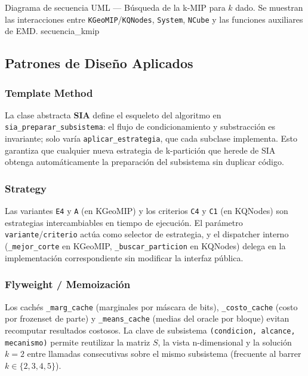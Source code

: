 %
  {Diagrama de secuencia UML — Búsqueda de la k-MIP para $k$ dado.
   Se muestran las interacciones entre \texttt{KGeoMIP}/\texttt{KQNodes},
   \texttt{System}, \texttt{NCube} y las funciones auxiliares de EMD.}%
  {secuencia_kmip}

\subsection{Patrones de Diseño Aplicados}

\subsubsection*{Template Method}

La clase abstracta \textbf{SIA} define el esqueleto del algoritmo en
\texttt{sia\_preparar\_subsistema}: el flujo de condicionamiento y substracción
es invariante; solo varía \texttt{aplicar\_estrategia}, que cada subclase
implementa. Esto garantiza que cualquier nueva estrategia de k-partición que
herede de SIA obtenga automáticamente la preparación del subsistema sin
duplicar código.

\subsubsection*{Strategy}

Las variantes \texttt{E4} y \texttt{A} (en KGeoMIP) y los criterios \texttt{C4}
y \texttt{C1} (en KQNodes) son estrategias intercambiables en tiempo de ejecución.
El parámetro \texttt{variante}/\texttt{criterio} actúa como selector de estrategia,
y el dispatcher interno (\texttt{\_mejor\_corte} en KGeoMIP, \texttt{\_buscar\_particion}
en KQNodes) delega en la implementación correspondiente sin modificar la interfaz
pública.

\subsubsection*{Flyweight / Memoización}

Los cachés \texttt{\_marg\_cache} (marginales por máscara de bits),
\texttt{\_costo\_cache} (costo por frozenset de parte) y \texttt{\_means\_cache}
(medias del oracle por bloque) evitan recomputar resultados costosos. La clave
de subsistema \texttt{(condicion, alcance, mecanismo)} permite reutilizar la
matriz $S$, la vista n-dimensional y la solución $k=2$ entre llamadas consecutivas
sobre el mismo subsistema (frecuente al barrer $k \in \{2,3,4,5\}$).

